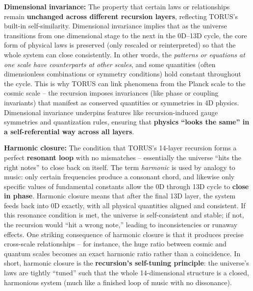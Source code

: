 \textbf{Dimensional invariance:} The property that certain laws or
relationships remain \textbf{unchanged across different recursion
layers}, reflecting TORUS's built-in self-similarity. Dimensional
invariance implies that as the universe transitions from one dimensional
stage to the next in the 0D--13D cycle, the core form of physical laws
is preserved (only rescaled or reinterpreted) so that the whole system
can close consistently. In other words, the \emph{patterns or equations
at one scale have counterparts at other scales}, and some quantities
(often dimensionless combinations or symmetry conditions) hold constant
throughout the cycle​. This is why TORUS can link phenomena from the
Planck scale to the cosmic scale -- the recursion imposes invariances
(like phase or coupling invariants) that manifest as conserved
quantities or symmetries in 4D physics​. Dimensional invariance
underpins features like recursion-induced gauge symmetries and
quantization rules, ensuring that \textbf{physics ``looks the same'' in
a self-referential way across all layers}.

\textbf{Harmonic closure:} The condition that TORUS's 14-layer recursion
forms a perfect \textbf{resonant loop} with no mismatches -- essentially
the universe ``hits the right notes'' to close back on itself. The term
\emph{harmonic} is used by analogy to music: only certain frequencies
produce a consonant chord, and likewise only specific values of
fundamental constants allow the 0D through 13D cycle to \textbf{close in
phase}​. Harmonic closure means that after the final 13D layer, the
system feeds back into 0D exactly, with all physical quantities aligned
and consistent​. If this resonance condition is met, the universe is
self-consistent and stable; if not, the recursion would ``hit a wrong
note,'' leading to inconsistencies or runaway effects. One striking
consequence of harmonic closure is that it produces precise cross-scale
relationships -- for instance, the huge ratio between cosmic and quantum
scales becomes an exact harmonic ratio rather than a coincidence​. In
short, harmonic closure is the \textbf{recursion's self-tuning
principle}: the universe's laws are tightly ``tuned'' such that the
whole 14-dimensional structure is a closed, harmonious system (much like
a finished loop of music with no dissonance).

